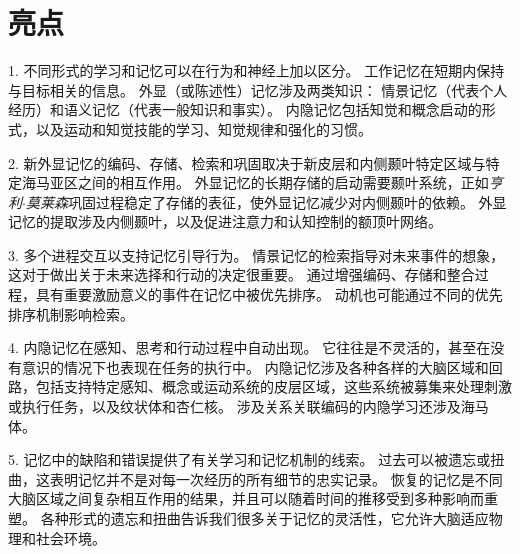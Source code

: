 \section{亮点}

1. 不同形式的学习和记忆可以在行为和神经上加以区分。 工作记忆在短期内保持与目标相关的信息。
外显（或陈述性）记忆涉及两类知识：
情景记忆（代表个人经历）和语义记忆（代表一般知识和事实）。
内隐记忆包括知觉和概念启动的形式，以及运动和知觉技能的学习、知觉规律和强化的习惯。 


2. 新外显记忆的编码、存储、检索和巩固取决于新皮层和内侧颞叶特定区域与特定海马亚区之间的相互作用。
外显记忆的长期存储的启动需要颞叶系统，正如\textit{亨利$\cdot$莫莱森}巩固过程稳定了存储的表征，使外显记忆减少对内侧颞叶的依赖。
外显记忆的提取涉及内侧颞叶，以及促进注意力和认知控制的额顶叶网络。


3. 多个进程交互以支持记忆引导行为。
情景记忆的检索指导对未来事件的想象，这对于做出关于未来选择和行动的决定很重要。
通过增强编码、存储和整合过程，具有重要激励意义的事件在记忆中被优先排序。
动机也可能通过不同的优先排序机制影响检索。 


4. 内隐记忆在感知、思考和行动过程中自动出现。
它往往是不灵活的，甚至在没有意识的情况下也表现在任务的执行中。
内隐记忆涉及各种各样的大脑区域和回路，包括支持特定感知、概念或运动系统的皮层区域，这些系统被募集来处理刺激或执行任务，以及纹状体和杏仁核。
涉及关系关联编码的内隐学习还涉及海马体。


5. 记忆中的缺陷和错误提供了有关学习和记忆机制的线索。
过去可以被遗忘或扭曲，这表明记忆并不是对每一次经历的所有细节的忠实记录。
恢复的记忆是不同大脑区域之间复杂相互作用的结果，并且可以随着时间的推移受到多种影响而重塑。
各种形式的遗忘和扭曲告诉我们很多关于记忆的灵活性，它允许大脑适应物理和社会环境。


